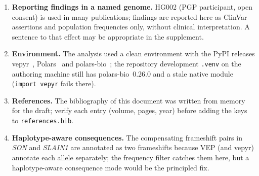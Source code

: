\begin{enumerate}
\item \textbf{Reporting findings in a named genome.} HG002 (PGP participant,
  open consent) is used in many publications; findings are reported here as
  ClinVar assertions and population frequencies only, without clinical
  interpretation. A sentence to that effect may be appropriate in the
  supplement.
\item \textbf{Environment.} The analysis used a clean environment with the
  PyPI releases vepyr~\VepyrVersion{}, Polars~\PolarsVersion{} and
  polars-bio~\PolarsBioVersion{}; the repository development
  \texttt{.venv} on the authoring machine still has polars-bio~0.26.0 and a
  stale native module (\texttt{import vepyr} fails there).
\item \textbf{References.} The bibliography of this document was written
  from memory for the draft; verify each entry (volume, pages, year) before
  adding the keys to \texttt{references.bib}.
\item \textbf{Haplotype-aware consequences.} The compensating frameshift
  pairs in \textit{SON} and \textit{SLAIN1} are annotated as two
  frameshifts because VEP (and vepyr) annotate each allele separately; the
  frequency filter catches them here, but a haplotype-aware consequence mode
  would be the principled fix.
\end{enumerate}
